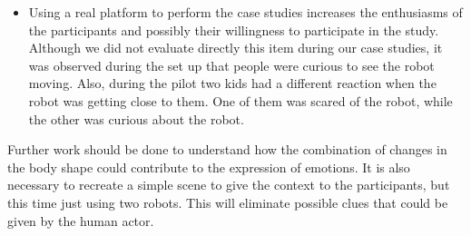 \begin{itemize}
	\item Using a real platform to perform the case studies increases the enthusiasms of the participants and possibly their willingness to participate in the study. Although we did not evaluate directly this item during our case studies, it was observed during the set up that people were curious to see the robot moving. Also, during the pilot two kids had a different reaction when the robot was getting close to them. One of them was scared of the robot, while the other was curious about the robot.
\end{itemize}
Further work should be done to understand how the combination of changes in the body shape could contribute to the expression of emotions. It is also necessary to recreate a simple scene to give the context to the participants, but this time just using two robots. This will eliminate possible clues that could be given by the human actor.
